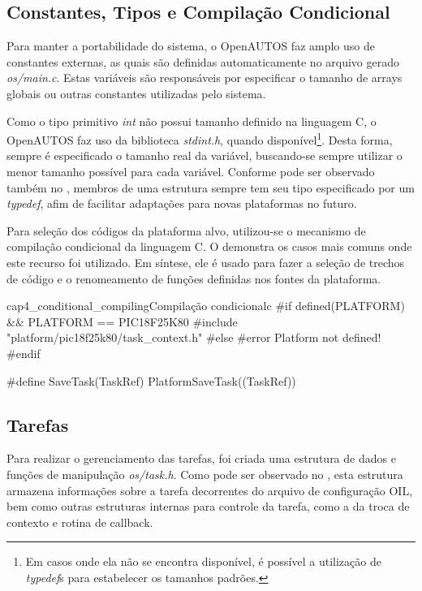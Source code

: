 \subsection{Constantes, Tipos e Compilação Condicional}

Para manter a portabilidade do sistema, o OpenAUTOS faz amplo uso de constantes externas, as quais são definidas automaticamente no arquivo gerado \emph{os/main.c}. Estas variáveis são responsáveis por especificar o tamanho de arrays globais ou outras constantes utilizadas pelo sistema.

Como o tipo primitivo \emph{int} não possui tamanho definido na linguagem C, o OpenAUTOS faz uso da biblioteca \emph{stdint.h}, quando disponível\footnote{Em casos onde ela não se encontra disponível, é possível a utilização de \emph{typedef}s para estabelecer os tamanhos padrões.}. Desta forma, sempre é especificado o tamanho real da variável, buscando-se sempre utilizar o menor tamanho possível para cada variável. Conforme pode ser observado também no , membros de uma estrutura sempre tem seu tipo especificado por um \emph{typedef}, afim de facilitar adaptações para novas plataformas no futuro.

Para seleção dos códigos da plataforma alvo, utilizou-se o mecanismo de compilação condicional da linguagem C. O  demonstra os casos mais comuns onde este recurso foi utilizado. Em síntese, ele é usado para fazer a seleção de trechos de código e o renomeamento de funções definidas nos fontes da plataforma.

\begin{algoritmo}{cap4_conditional_compiling}{Compilação condicional}{c}
#if defined(PLATFORM) &&  PLATFORM == PIC18F25K80
#include "platform/pic18f25k80/task_context.h"
#else
#error Platform not defined!
#endif

#define SaveTask(TaskRef) PlatformSaveTask((TaskRef))
\end{algoritmo}

\subsection{Tarefas}

Para realizar o gerenciamento das tarefas, foi criada uma estrutura de dados e funções de manipulação \emph{os/task.h}. Como pode ser observado no , esta estrutura armazena informações sobre a tarefa decorrentes do arquivo de configuração OIL, bem como outras estruturas internas para controle da tarefa, como a da troca de contexto e rotina de callback.

